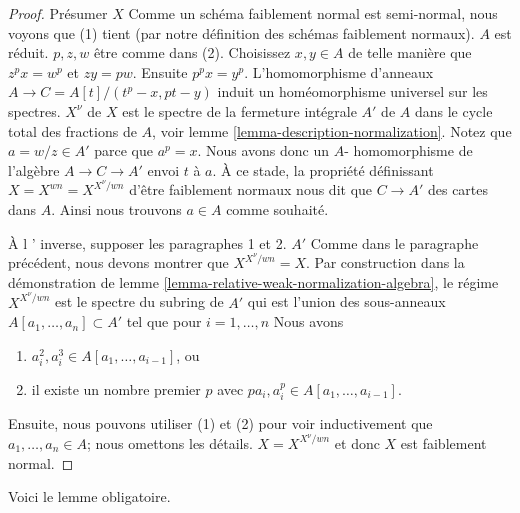 \begin{proof}

Présumer $X$ Comme un schéma faiblement normal est semi-normal, nous voyons que (1) tient (par notre définition des schémas faiblement normaux). $A$ est réduit. $p, z, w$ être comme dans (2). Choisissez $x, y \in A$ de telle manière que $z^p x = w^p$ et $zy = pw$. Ensuite $p^p x = y^p$. L'homomorphisme d'anneaux
$A \to C = A[t]/(t^p - x, pt - y)$ induit un homéomorphisme universel sur les spectres. $X^\nu$ de $X$
est le spectre de la fermeture intégrale $A'$
de $A$ dans le cycle total des fractions de $A$, voir lemme \ref{lemma-description-normalization}. Notez que $a = w/z \in A'$ parce que $a^p = x$. Nous avons donc un $A$- homomorphisme de l'algèbre $A \to C \to A'$
envoi $t$ à $a$. À ce stade, la propriété définissant $X = X^{wn} = X^{X^\nu/wn}$
d'être faiblement normaux nous dit que $C \to A'$ des cartes dans $A$. Ainsi nous trouvons $a \in A$ comme souhaité.

\medskip\noindent

À l ' inverse, supposer les paragraphes 1 et 2. $A'$ Comme dans le paragraphe précédent, nous devons montrer que $X^{X^\nu/wn} = X$. Par construction dans la démonstration de lemme \ref{lemma-relative-weak-normalization-algebra}, le régime
$X^{X^\nu/wn}$ est le spectre du subring de $A'$
qui est l'union des sous-anneaux $A[a_1, \ldots, a_n] \subset A'$
tel que pour $i = 1, \ldots, n$ Nous avons

\begin{enumerate}

\item[(a)]  $a_i^2, a_i^3 \in A[a_1, \ldots, a_{i - 1}]$, ou
\item[(b)] il existe un nombre premier $p$ avec
$pa_i, a_i^p \in A[a_1, \ldots, a_{i - 1}]$.

\end{enumerate}

Ensuite, nous pouvons utiliser (1) et (2) pour voir inductivement que $a_1, \ldots, a_n \in A$; nous omettons les détails. $X = X^{X^\nu/wn}$ et donc
$X$ est faiblement normal.

\end{proof}

\noindent
Voici le lemme obligatoire.


